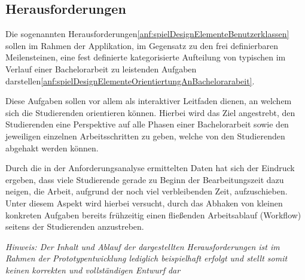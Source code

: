 \documentclass[bibliography=totoc,listof=totoc,BCOR=5mm,DIV=12,oneside]{scrbook}
\begin{document}
\newpage
\subsection{Herausforderungen}
\par Die sogenannten Herausforderungen\ref{anf:spielDesignElementeBenutzerklassen} sollen im Rahmen der Applikation, im Gegensatz zu den frei definierbaren Meilensteinen, eine fest definierte kategorisierte Aufteilung von typischen im Verlauf einer Bachelorarbeit zu leistenden Aufgaben darstellen\ref{anf:spielDesignElementeOrientiertungAnBachelorarabeit}. 
\par \bigskip Diese Aufgaben sollen vor allem als interaktiver Leitfaden dienen, an welchem sich die Studierenden orientieren können. Hierbei wird das Ziel angestrebt, den Studierenden eine Perspektive auf alle Phasen einer Bachelorarbeit sowie den jeweiligen einzelnen Arbeitsschritten zu geben, welche von den Studierenden abgehakt werden können.
\par \bigskip Durch die in der Anforderungsanalyse ermittelten Daten hat sich der Eindruck ergeben, dass viele Studierende gerade zu Beginn der Bearbeitungszeit dazu neigen, die Arbeit, aufgrund der noch viel verbleibenden Zeit, aufzuschieben. Unter diesem Aspekt wird hierbei versucht, durch das Abhaken von kleinen konkreten Aufgaben bereits frühzeitig einen fließenden Arbeitsablauf (Workflow) seitens der Studierenden anzustreben.

\par \bigskip \textit{Hinweis: Der Inhalt und Ablauf der dargestellten Herausforderungen ist im Rahmen der Prototypentwicklung lediglich beispielhaft erfolgt und stellt somit keinen korrekten und vollständigen Entwurf dar}
\end{document}
